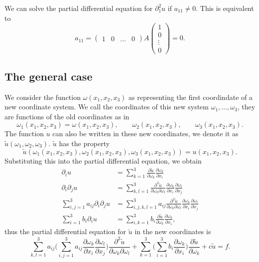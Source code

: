 We can solve the partial differential equation for $\partial_1^2u$
if $a_{11}\ne 0$.
This is equivalent to
\[
a_{11}=\begin{pmatrix}
1&0&\dots&0
\end{pmatrix}
A
\begin{pmatrix}1\\0\\\vdots\\0\end{pmatrix}
=0.
\]

\subsection{The general case\label{subsection:the-general-case}}
We consider the function
$\omega(x_1,x_2,x_3)$
as representing the first coordindate of a new coordinate system.
We call the coordinates of this new system
$\omega_1,\dots,\omega_3$,
they are functions of the old coordinates as in
\[
\omega_1(x_1,x_2,x_3)=\omega(x_1,x_2,x_3)
,\qquad
\omega_2(x_1,x_2,x_3)
,\qquad
\omega_3(x_1,x_2,x_3).
\]
The function $u$ can also be written in these new coordinates,
we denote it as $\tilde u(\omega_1,\omega_2,\omega_3)$.
$\tilde u$ has the property
\[
\tilde u(
\omega_1(x_1,x_2,x_3),
\omega_2(x_1,x_2,x_3),
\omega_3(x_1,x_2,x_3)) = u(x_1,x_2,x_3).
\]
Substituting this into the partial differential equation, we obtain
\begin{align*}
\partial_iu
&=
\sum_{k=1}^3
\frac{\partial\tilde u}{\partial \omega_k}
\frac{\partial\omega_k}{\partial x_i}
\\
\partial_i\partial_ju
&=
\sum_{k,l=1}^3
\frac{\partial^2\tilde u}{\partial \omega_k\partial\omega_l}
\frac{\partial\omega_k}{\partial x_i}
\frac{\partial\omega_l}{\partial x_j}
\\
\sum_{i,j=1}^3a_{ij}\partial_i\partial_ju
&=
\sum_{i,j,k,l=1}^3a_{ij}
\frac{\partial^2\tilde u}{\partial \omega_k\partial\omega_l}
\frac{\partial\omega_k}{\partial x_i}
\frac{\partial\omega_l}{\partial x_j}
\\
\sum_{i=1}^3b_i\partial_iu
&=
\sum_{i,k=1}^3b_i
\frac{\partial\tilde u}{\partial \omega_k}
\frac{\partial\omega_k}{\partial x_i},
\end{align*}
thus the partial differential equation for $\tilde u$ in the
new coordinates is
\[
\sum_{k,l=1}^3a_{ij}
\biggl(
\sum_{i,j=1}^3a_{ij}
\frac{\partial\omega_k}{\partial x_i}
\frac{\partial\omega_l}{\partial x_j}
\biggr)
\frac{\partial^2\tilde u}{\partial \omega_k\partial\omega_l}
+
\sum_{k=1}^3
\biggl(
\sum_{i=1}^3
b_i
\frac{\partial\omega_k}{\partial x_i}
\biggr)
\frac{\partial\tilde u}{\partial \omega_k}
+c\tilde u
=f.
\]
